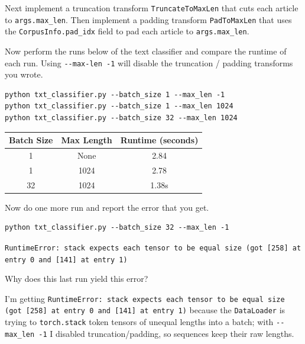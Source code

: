 \documentclass[11pt,addpoints,answers]{exam}
\begin{document}
\begin{questions}
\begin{parts}
Next implement a truncation transform \lstinline{TruncateToMaxLen} that cuts each article to \lstinline{args.max_len}. Then implement a padding transform \lstinline{PadToMaxLen} that uses the \lstinline{CorpusInfo.pad_idx} field to pad each article to \lstinline{args.max_len}.


\begin{subparts}

    \subpart[1] Now perform the runs below of the text classifier and compare the runtime of each run. Using \lstinline{--max-len -1} will disable the truncation / padding transforms you wrote.
\begin{lstlisting}
python txt_classifier.py --batch_size 1 --max_len -1
python txt_classifier.py --batch_size 1 --max_len 1024
python txt_classifier.py --batch_size 32 --max_len 1024
\end{lstlisting}

    \begin{answer_box}[title=,height=4cm, width=15cm]
    \begin{tabular}{ccc}
    \toprule
    \bf Batch Size & \bf Max Length & \bf Runtime (seconds) \\
    \midrule
    1 & None & 2.84\\
    1 & 1024 & 2.78\\
    32 & 1024 & 1.38s \\
    \bottomrule
    \end{tabular}
    
    \end{answer_box}

    \subpart[1] Now do one more run and report the error that you get.
\begin{lstlisting}
python txt_classifier.py --batch_size 32 --max_len -1
\end{lstlisting}
    \begin{answer_box}[title=,height=2cm, width=15cm]
    \texttt{RuntimeError: stack expects each tensor to be equal size (got [258] at entry 0 and [141] at entry 1)}
    \end{answer_box}
    
    \subpart[2] Why does this last run yield this error?
    \begin{answer_box}[title=,height=2.5cm, width=15cm]
    I’m getting \texttt{RuntimeError: stack expects each tensor to be equal size (got [258] at entry 0 and [141] at entry 1)} because the \lstinline{DataLoader} is trying to \lstinline{torch.stack} token tensors of unequal lengths into a batch; with \lstinline{--max_len -1} I disabled truncation/padding, so sequences keep their raw lengths. 


\end{answer_box}
\end{subparts}
\end{parts}
\end{questions}
\end{document}
